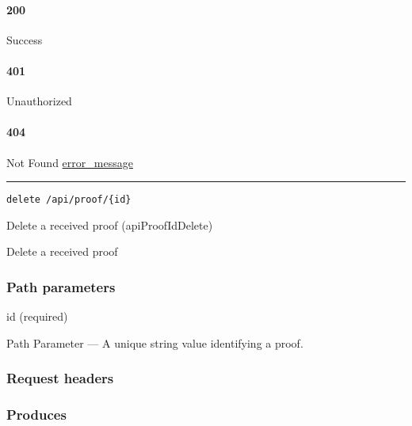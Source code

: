 \hypertarget{section-535}{%
\paragraph{200}\label{section-535}}

Success

\hypertarget{section-536}{%
\paragraph{401}\label{section-536}}

Unauthorized \protect\hyperlink{}{}

\hypertarget{section-537}{%
\paragraph{404}\label{section-537}}

Not Found \protect\hyperlink{error_message}{error\_message}

\begin{center}\rule{0.5\linewidth}{\linethickness}\end{center}

\protect\hypertarget{apiProofIdDelete}{}{}

\begin{verbatim}
delete /api/proof/{id}
\end{verbatim}

Delete a received proof ({apiProofIdDelete})

Delete a received proof

\hypertarget{path-parameters-89}{%
\subsubsection{Path parameters}\label{path-parameters-89}}

id (required)

{Path Parameter} --- A unique string value identifying a proof.

\hypertarget{request-headers-89}{%
\subsubsection{Request headers}\label{request-headers-89}}

\hypertarget{produces-162}{%
\subsubsection{Produces}\label{produces-162}}

